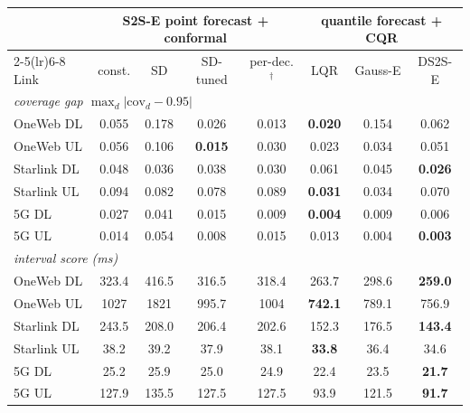 \begin{tabular}{lccccccc}
\toprule
 & \multicolumn{4}{c}{S2S-E point forecast + conformal} & \multicolumn{3}{c}{quantile forecast + CQR} \\
\cmidrule(lr){2-5}\cmidrule(lr){6-8}
Link & const. & SD & SD-tuned & per-dec.$^\dagger$ & LQR & Gauss-E & DS2S-E \\
\midrule
\multicolumn{8}{l}{\emph{coverage gap $\max_d|\mathrm{cov}_d-0.95|$}} \\
OneWeb DL & 0.055 & 0.178 & 0.026 & 0.013 & \textbf{0.020} & 0.154 & 0.062 \\
OneWeb UL & 0.056 & 0.106 & \textbf{0.015} & 0.030 & 0.023 & 0.034 & 0.051 \\
Starlink DL & 0.048 & 0.036 & 0.038 & 0.030 & 0.061 & 0.045 & \textbf{0.026} \\
Starlink UL & 0.094 & 0.082 & 0.078 & 0.089 & \textbf{0.031} & 0.034 & 0.070 \\
5G DL & 0.027 & 0.041 & 0.015 & 0.009 & \textbf{0.004} & 0.009 & 0.006 \\
5G UL & 0.014 & 0.054 & 0.008 & 0.015 & 0.013 & 0.004 & \textbf{0.003} \\
\midrule
\multicolumn{8}{l}{\emph{interval score (ms)}} \\
OneWeb DL & 323.4 & 416.5 & 316.5 & 318.4 & 263.7 & 298.6 & \textbf{259.0} \\
OneWeb UL & 1027 & 1821 & 995.7 & 1004 & \textbf{742.1} & 789.1 & 756.9 \\
Starlink DL & 243.5 & 208.0 & 206.4 & 202.6 & 152.3 & 176.5 & \textbf{143.4} \\
Starlink UL & 38.2 & 39.2 & 37.9 & 38.1 & \textbf{33.8} & 36.4 & 34.6 \\
5G DL & 25.2 & 25.9 & 25.0 & 24.9 & 22.4 & 23.5 & \textbf{21.7} \\
5G UL & 127.9 & 135.5 & 127.5 & 127.5 & 93.9 & 121.5 & \textbf{91.7} \\
\bottomrule
\end{tabular}
